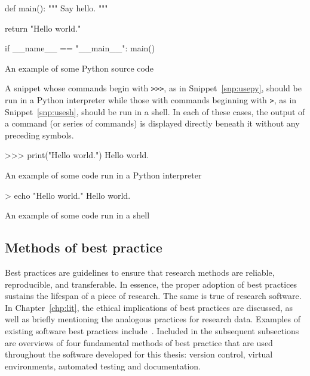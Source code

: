\begin{listing}[htbp]
\begin{sourcepy}
def main():
    """ Say hello. """

    return "Hello world."

if __name__ == "__main__":
    main()
\end{sourcepy}
\caption{An example of some Python source code}\label{snp:source}
\end{listing}

A snippet whose commands begin with \texttt{>>>}, as in
Snippet~\ref{snp:usepy}, should be run in a Python interpreter while those with
commands beginning with \texttt{>}, as in Snippet~\ref{snp:usesh},
should be run in a shell. In each of these cases, the output of a command (or
series of commands) is displayed directly beneath it without any preceding
symbols.

\begin{listing}[htbp]
\begin{usagepy}
>>> print("Hello world.")
Hello world.

\end{usagepy}
\caption{An example of some code run in a Python interpreter}\label{snp:usepy}
\end{listing}

\begin{listing}[htbp]
\begin{usagesh}
> echo "Hello world."
Hello world.
\end{usagesh}
\caption{An example of some code run in a shell}\label{snp:usesh}
\end{listing}

\subsection{Methods of best practice}

Best practices are guidelines to ensure that research methods are reliable,
reproducible, and transferable. In essence, the proper adoption of best
practices sustains the lifespan of a piece of research. The same is true of
research software. In Chapter~\ref{chp:lit}, the ethical implications of best
practices are discussed, as well as briefly mentioning the analogous practices
for research data. Examples of existing software best practices
include~\cite{Aberdour2007,Benureau2018,Jimenez2017,Wilson2014}. Included in the
subsequent subsections are overviews of four fundamental methods of best
practice that are used throughout the software developed for this thesis:
version control, virtual environments, automated testing and documentation.

